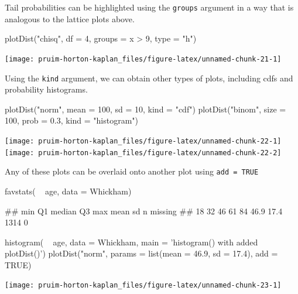 \noindent
Tail probabilities can be highlighted using the \texttt{groups} argument
in a way that is analogous to the lattice plots above.

\begin{Schunk}
\begin{Sinput}
plotDist("chisq", df = 4, groups = x > 9, type = "h")
\end{Sinput}


\begin{center}\texttt{[image: pruim-horton-kaplan\_files/figure-latex/unnamed-chunk-21-1]} \end{center}

\end{Schunk}

\noindent
Using the \texttt{kind} argument, we can obtain other types of plots,
including cdfs and probability histograms.

\begin{Schunk}
\begin{Sinput}
plotDist("norm", mean = 100, sd = 10, kind = "cdf")
plotDist("binom", size = 100, prob = 0.3, kind = "histogram")
\end{Sinput}


\begin{center}\texttt{[image: pruim-horton-kaplan\_files/figure-latex/unnamed-chunk-22-1]} \texttt{[image: pruim-horton-kaplan\_files/figure-latex/unnamed-chunk-22-2]} \end{center}

\end{Schunk}

\noindent
Any of these plots can be overlaid onto another plot using
\texttt{add\ =\ TRUE}

\begin{Schunk}
\begin{Sinput}
favstats( ~ age, data = Whickham)
\end{Sinput}
\begin{Soutput}
##  min Q1 median Q3 max mean   sd    n missing
##   18 32     46 61  84 46.9 17.4 1314       0
\end{Soutput}
\begin{Sinput}
histogram( ~ age, data = Whickham, main = 'histogram() with added plotDist()')
plotDist("norm", params = list(mean = 46.9, sd = 17.4), add = TRUE)
\end{Sinput}


\begin{center}\texttt{[image: pruim-horton-kaplan\_files/figure-latex/unnamed-chunk-23-1]} \end{center}

\end{Schunk}

